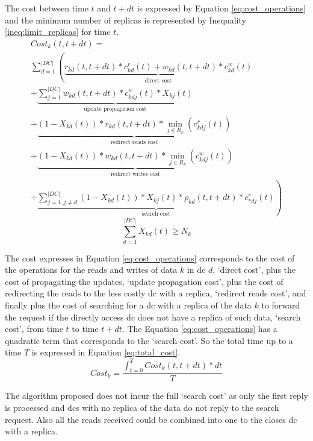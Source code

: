 \documentclass{acm_proc_article-sp}
\begin{document}
The cost between time $t$ and $t+dt$ is expressed by Equation \ref{eq:cost_operations} and the minimum number of replicas is represented by Inequality \ref{ineq:limit_replicas} for time $t$.
\begin{equation} \label{eq:cost_operations}
	\begin{split}
		 Cost_{k}(t, t+dt) =\\
		  \sum^{|DC|}_{d = 1} \left(\underbrace{r_{kd}(t, t+dt) * c^{r}_{kd}(t) + w_{kd}(t, t+dt) * c^{w}_{kd}(t)}_\text{direct cost} \right. \\
		 \left. + \underbrace{\sum^{|DC|}_{j = 1} w_{kd}(t, t+dt) * c^{w}_{kdj}(t) * X_{kj}(t)}_\text{update propagation cost} \right. \\ 
		 \left. + \underbrace{(1 - X_{kd}(t)) * r_{kd}(t, t+dt) * \min_{j \in R_{k}}(c^{r}_{kdj}(t))}_\text{redirect reads cost} \right. \\  
		 \left. + \underbrace{(1 - X_{kd}(t)) * w_{kd}(t, t+dt) * \min_{j \in R_{k}}(c^{w}_{kdj}(t))}_\text{redirect writes cost}  \right. \\ \left. + \underbrace{\sum^{|DC|}_{j = 1, j \neq d}  (1 - X_{kd}(t)) * X_{kj}(t) * \rho_{kd}(t, t+dt)  * c^{r}_{*dj}(t)}_\text{search cost}\right)
	 \end{split}
\end{equation}
\begin{equation} \label{ineq:limit_replicas}
	\sum^{|DC|}_{d = 1} X_{kd}(t) \ge N_{k}
\end{equation}

The cost expresses in Equation \ref{eq:cost_operations} corresponds to the cost of the operations for the reads and writes of data $k$ in \gls{dc} $d$, `direct cost', plus the cost of propagating the updates, `update propagation cost', plus the cost of redirecting the reads to the less costly \gls{dc} with a replica, `redirect reads cost', and finally plus the cost of searching for a \gls{dc} with a replica of the data $k$ to forward the request if the directly access \gls{dc} does not have a replica of such data, `search cost', from time $t$ to time $t+dt$. The Equation \ref{eq:cost_operations} has a quadratic term that corresponds to the `search cost'. So the total time up to a time $T$ is expressed in Equation \ref{eq:total_cost}.
\begin{equation} \label{eq:total_cost}
	Cost_{k} = \frac{\int^{T}_{t = 0} Cost_{k}(t, t+dt) * dt}{T}
\end{equation}

The algorithm proposed does not incur the full `search cost' as only the first reply is processed and \glspl{dc} with no replica of the data do not reply to the search request. Also all the reads received could be combined into one to the closes \gls{dc} with a replica.
\end{document}
